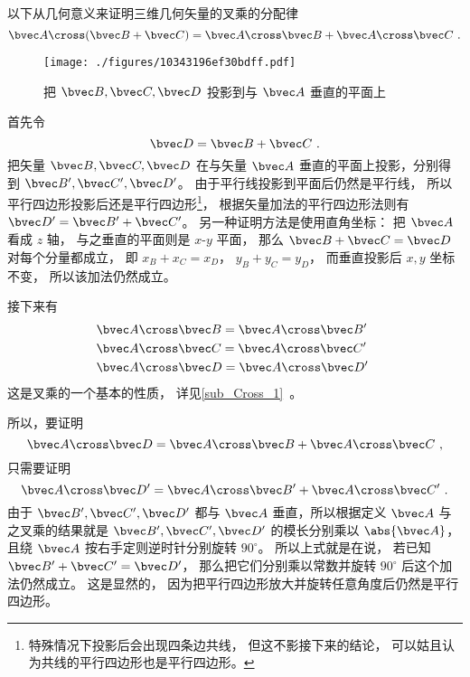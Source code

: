 
以下从几何意义来证明三维几何矢量的叉乘的分配律
\begin{equation}
\bvec A \cross (\bvec B + \bvec C) = \bvec A \cross \bvec B + \bvec A \cross \bvec C~.
\end{equation}

\begin{figure}[ht]
\vskip-10pt
\centering
\texttt{[image: ./figures/10343196ef30bdff.pdf]}
\caption{把 $\bvec B,\bvec C,\bvec D$ 投影到与 $\bvec A$ 垂直的平面上}\label{fig_CrossP_1}
\end{figure}

首先令
\begin{equation}
\bvec D = \bvec B + \bvec C~.
\end{equation}
把矢量 $\bvec B,\bvec C,\bvec D$ 在与矢量 $\bvec A$ 垂直的平面上投影，分别得到 $\bvec B',\bvec C',\bvec D'$。 由于平行线投影到平面后仍然是平行线， 所以平行四边形投影后还是平行四边形\footnote{特殊情况下投影后会出现四条边共线， 但这不影接下来的结论， 可以姑且认为共线的平行四边形也是平行四边形。}， 根据矢量加法的平行四边形法则有 $\bvec D'=\bvec B'+\bvec C'$。 另一种证明方法是使用直角坐标： 把 $\bvec A$ 看成 $z$ 轴， 与之垂直的平面则是 $x$-$y$ 平面， 那么 $\bvec B + \bvec C = \bvec D$ 对每个分量都成立， 即 $x_B + x_C = x_D$， $y_B + y_C = y_D$， 而垂直投影后 $x,y$ 坐标不变， 所以该加法仍然成立。

接下来有
\begin{equation}\label{eq_CrossP_2}
\begin{aligned}
&\bvec A \cross \bvec B = \bvec A \cross \bvec B'\\
&\bvec A \cross \bvec C = \bvec A \cross \bvec C'\\
&\bvec A \cross \bvec D = \bvec A \cross \bvec D'
\end{aligned}~
\end{equation} 
这是叉乘的一个基本的性质， 详见\autoref{sub_Cross_1}~。

所以，要证明
\begin{equation}\label{eq_CrossP_1}
\bvec A \cross \bvec D = \bvec A \cross \bvec B + \bvec A \cross \bvec C~,
\end{equation}
只需要证明
\begin{equation}
\bvec A \cross \bvec D' = \bvec A \cross \bvec B' + \bvec A \cross \bvec C'~.
\end{equation}
由于 $\bvec B', \bvec C', \bvec D'$ 都与 $\bvec A$ 垂直，所以根据定义 $\bvec A$ 与之叉乘的结果就是 $\bvec B', \bvec C', \bvec D'$ 的模长分别乘以 $\abs {\bvec A}$， 且绕 $\bvec A$ 按右手定则逆时针分别旋转 $90^\circ$。 所以上式就是在说， 若已知 $\bvec B' + \bvec C' = \bvec D'$， 那么把它们分别乘以常数并旋转 $90^\circ$ 后这个加法仍然成立。 这是显然的， 因为把平行四边形放大并旋转任意角度后仍然是平行四边形。

